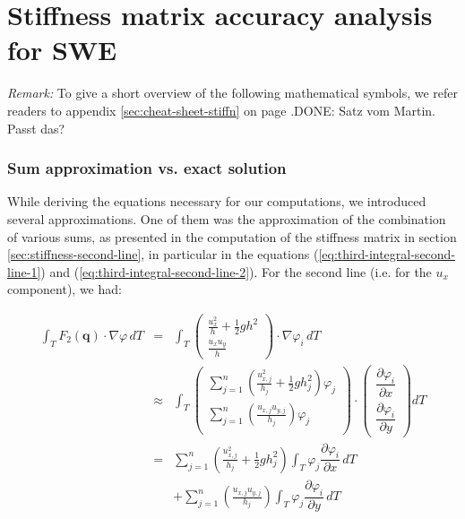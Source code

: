 \documentclass{article}
\newcommand{\done}[2][]{\textcolor{green!50!black}{DONE\ifthenelse{\equal{#1}{}}{}{[#1]}: #2}}
\newcommand{\pd}[2]{\dfrac{\partial #1}{\partial #2}}
\renewcommand{\phi}{\varphi}
\begin{document}
\clearpage{}

\part{Stiffness matrix accuracy analysis for SWE}
\label{part:stiffness-matrix}

\emph{Remark:} To give a short overview of the following mathematical symbols, we refer readers to appendix \ref{sec:cheat-sheet-stiffn} on page \pageref{sec:cheat-sheet-stiffn}.\done{Satz vom Martin. Passt das?}

\section{Sum approximation vs. exact solution}
\label{sec:point-wise-appr-vs-exact-solution-intro}

While deriving the equations necessary for our computations, we introduced several approximations. One of them was the approximation of the combination of various sums, as presented in the computation of the stiffness matrix in section \ref{sec:stiffness-second-line}, in particular in the equations (\ref{eq:third-integral-second-line-1}) and (\ref{eq:third-integral-second-line-2}). For the second line (i.e. for the $u_x$ component), we had:

\begin{eqnarray}
  \label{eq:third-integral-second-line-1-analysis-part}
  \int_T F_2(\mathbf{q}) \cdot \nabla \phi \, dT & = &
  \int_T
  \begin{pmatrix}
    \frac{u_x^2}{h} + \frac{1}{2} g h^2 \\ \frac{u_x u_y}{h}
  \end{pmatrix}
  \cdot \nabla \phi_i \, dT \\
  \label{eq:third-integral-second-line-2-analysis-part}
  & \approx &
  \int_T
  \begin{pmatrix}
    \sum_{j=1}^n \left(\frac{u_{x,j}^2}{h_j} + \frac{1}{2} g h_j^2\right) \phi_j \\
    \sum_{j=1}^n \left(\frac{u_{x,j} u_{y,j}}{h_j}\right) \phi_j \\
  \end{pmatrix}
  \cdot
  \begin{pmatrix}
    \pd{\phi_i}{x} \\
    \pd{\phi_i}{y}
  \end{pmatrix} dT \\
  & = & \nonumber \sum_{j=1}^n \left(\frac{u_{x,j}^2}{h_j} + \frac{1}{2} g h_j^2\right) \int_T \phi_j \pd{\phi_i}{x} \, dT \\
  & {} & + \nonumber \sum_{j=1}^n \left(\frac{u_{x,j} u_{y,j}}{h_j}\right) \int_T \phi_j \pd{\phi_i}{y} \, dT
\end{eqnarray}
\end{document}
